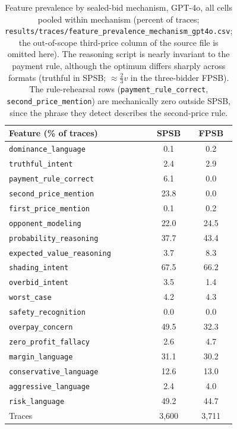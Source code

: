 \begin{table}[htbp]
\centering
\footnotesize
\setlength{\tabcolsep}{6pt}
\begin{tabular}{lcc}
\toprule
Feature (\% of traces) & SPSB & FPSB \\
\midrule
\texttt{dominance\_language} & 0.1 & 0.2 \\
\texttt{truthful\_intent} & 2.4 & 2.9 \\
\texttt{payment\_rule\_correct} & 6.1 & 0.0 \\
\texttt{second\_price\_mention} & 23.8 & 0.0 \\
\texttt{first\_price\_mention} & 0.1 & 0.2 \\
\texttt{opponent\_modeling} & 22.0 & 24.5 \\
\texttt{probability\_reasoning} & 37.7 & 43.4 \\
\texttt{expected\_value\_reasoning} & 3.7 & 8.3 \\
\texttt{shading\_intent} & 67.5 & 66.2 \\
\texttt{overbid\_intent} & 3.5 & 1.4 \\
\texttt{worst\_case} & 4.2 & 4.3 \\
\texttt{safety\_recognition} & 0.0 & 0.0 \\
\texttt{overpay\_concern} & 49.5 & 32.3 \\
\texttt{zero\_profit\_fallacy} & 2.6 & 4.7 \\
\texttt{margin\_language} & 31.1 & 30.2 \\
\texttt{conservative\_language} & 12.6 & 13.0 \\
\texttt{aggressive\_language} & 2.4 & 4.0 \\
\texttt{risk\_language} & 49.2 & 44.7 \\
\midrule
Traces & 3{,}600 & 3{,}711 \\
\bottomrule
\end{tabular}
\caption{Feature prevalence by sealed-bid mechanism, GPT-4o, all cells pooled within mechanism (percent of traces; \texttt{results/traces/feature\_prevalence\_mechanism\_gpt4o.csv}; the out-of-scope third-price column of the source file is omitted here). The reasoning script is nearly invariant to the payment rule, although the optimum differs sharply across formats (truthful in SPSB; $\approx\frac{2}{3}v$ in the three-bidder FPSB). The rule-rehearsal rows (\texttt{payment\_rule\_correct}, \texttt{second\_price\_mention}) are mechanically zero outside SPSB, since the phrase they detect describes the second-price rule.}
\label{tab:trace-prevalence-mechanisms}
\end{table}

